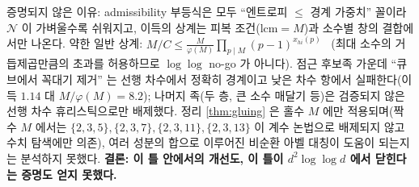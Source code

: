 증명되지 않은 이유: admissibility 부등식은 모두 ``엔트로피 $\le$ 경계 가중치'' 꼴이라 $\mathcal N$ 이 가벼울수록 쉬워지고, 이득의 상계는 피복 조건($\mathrm{lcm}=M$)과 소수별 창의 결합에서만 나온다. 약한 일반 상계: $M/C\le\tfrac M{\varphi(M)}\prod_{p\mid M}(p-1)^{x_{hi}(p)}$ \tagP\ (최대 소수의 거듭제곱만큼의 초과를 허용하므로 $\log\log$ no-go 가 아니다). 점근 후보족 가운데 ``큐브에서 꼭대기 제거'' 는 선행 차수에서 정확히 경계이고 낮은 차수 항에서 실패한다(이득 $1.14$ 대 $M/\varphi(M)=8.2$); 나머지 족(두 층, 큰 소수 매달기 등)은 검증되지 않은 선행 차수 휴리스틱으로만 배제했다. 정리 \ref{thm:gluing} 은 홀수 $M$ 에만 적용되며(짝수 $M$ 에서는 $\{2,3,5\},\{2,3,7\},\{2,3,11\},\{2,3,13\}$ 이 계수 논법으로 배제되지 않고 수치 탐색에만 의존), 여러 성분의 합으로 이루어진 비순환 아벨 대칭이 도움이 되는지는 분석하지 못했다. \textbf{결론: 이 틀 안에서의 개선도, 이 틀이 $d^2\log\log d$ 에서 닫힌다는 증명도 얻지 못했다.}
